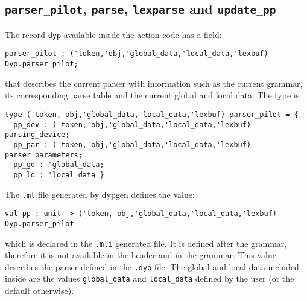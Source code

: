 \documentclass[12pt]{article}
\begin{document}
{\subsection{\texttt{parser\_pilot}, \texttt{parse}, \texttt{lexparse} and \texttt{update\_pp}}\label{parse}

The record \verb|dyp| available inside the action code has a field:
\begin{verbatim}
parser_pilot : ('token,'obj,'global_data,'local_data,'lexbuf) Dyp.parser_pilot;
\end{verbatim}
that describes the current parser with information such as the current grammar, its corresponding parse table and the current global and local data. The type is
\begin{verbatim}
type ('token,'obj,'global_data,'local_data,'lexbuf) parser_pilot = {
  pp_dev : ('token,'obj,'global_data,'local_data,'lexbuf) parsing_device;
  pp_par : ('token,'obj,'global_data,'local_data,'lexbuf) parser_parameters;
  pp_gd : 'global_data;
  pp_ld : 'local_data }
\end{verbatim}
The \verb|.ml| file generated by dypgen defines the value:
\begin{verbatim}
val pp : unit -> ('token,'obj,'global_data,'local_data,'lexbuf) Dyp.parser_pilot
\end{verbatim}
which is declared in the \verb|.mli| generated file. It is defined after the grammar, therefore it is not available in the header and in the grammar. This value describes the parser defined in the \verb|.dyp| file. The global and local data included inside are the values \verb|global_data| and \verb|local_data| defined by the user (or the default otherwise).\\

}
\end{document}
